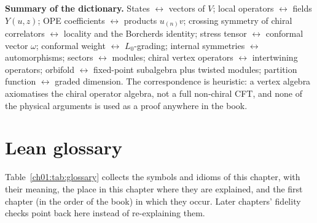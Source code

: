 \begin{physics}
\textbf{Summary of the dictionary.} States $\leftrightarrow$ vectors of $V$; local operators
$\leftrightarrow$ fields $Y(u,z)$; OPE coefficients $\leftrightarrow$ products $u_{(n)}v$; crossing
symmetry of chiral correlators $\leftrightarrow$ locality and the Borcherds identity; stress tensor
$\leftrightarrow$ conformal vector $\omega$; conformal weight $\leftrightarrow$ $L_0$-grading;
internal symmetries $\leftrightarrow$ automorphisms; sectors $\leftrightarrow$ modules; chiral vertex
operators $\leftrightarrow$ intertwining operators; orbifold $\leftrightarrow$ fixed-point subalgebra
plus twisted modules; partition function $\leftrightarrow$ graded dimension. The correspondence is
heuristic: a vertex algebra axiomatises the chiral operator algebra, not a full non-chiral CFT, and
none of the physical arguments is used as a proof anywhere in the book.
\end{physics}

\section{Lean glossary}\label{ch01:sec:glossary}

Table~\ref{ch01:tab:glossary} collects the symbols and idioms of this chapter, with their meaning, the
place in this chapter where they are explained, and the first chapter (in the order of the book) in
which they occur. Later chapters' fidelity checks point back here instead of re-explaining them.

